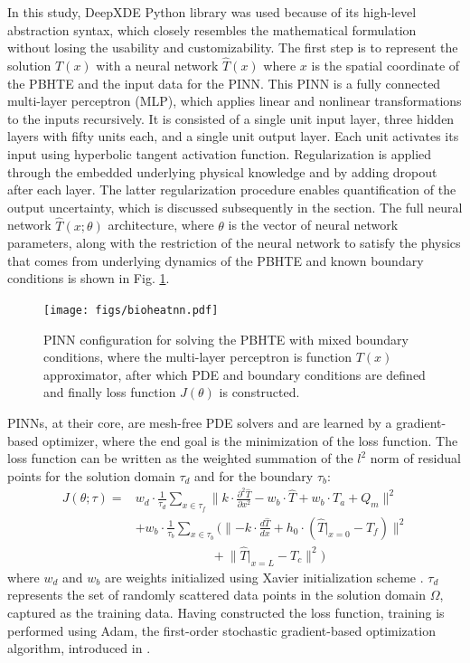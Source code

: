 \documentclass[conference]{IEEEtran}
\begin{document}
In this study, DeepXDE Python library \cite{lu_deepxde_2019} was used because of its high-level abstraction syntax, which closely resembles the mathematical formulation without losing the usability and customizability. The first step is to represent the solution $T(x)$ with a neural network $\hat{T}(x)$ where $x$ is the spatial coordinate of the PBHTE and the input data for the PINN. This PINN is a fully connected multi-layer perceptron (MLP), which applies linear and nonlinear transformations to the inputs recursively. It is consisted of a single unit input layer, three hidden layers with fifty units each, and a single unit output layer. Each unit activates its input using hyperbolic tangent activation function. Regularization is applied through the embedded underlying physical knowledge and by adding dropout after each layer. The latter regularization procedure enables quantification of the output uncertainty, which is discussed subsequently in the section. The full neural network $\hat T(x;\theta)$ architecture, where $\theta$ is the vector of neural network parameters, along with the restriction of the neural network to satisfy the physics that comes from underlying dynamics of the PBHTE and known boundary conditions is shown in Fig. \ref{fig.bioheatnn}.
\begin{figure}[ht]
  \centering
  \texttt{[image: figs/bioheatnn.pdf]}
  \caption{PINN configuration for solving the PBHTE with mixed boundary conditions, where the multi-layer perceptron is function $T(x)$ approximator, after which PDE and boundary conditions are defined and finally loss function $J(\theta)$ is constructed.}
  \label{fig.bioheatnn}
\end{figure}

PINNs, at their core, are mesh-free PDE solvers and are learned by a gradient-based optimizer, where the end goal is the minimization of the loss function. The loss function can be written as the weighted summation of the $l^2$ norm of residual points for the solution domain $\tau_d$ and for the boundary $\tau_b$:
\begin{equation}
\begin{aligned}
    J(\theta; \tau) = & w_d \cdot \frac{1}{\tau_d} \sum_{x \in \tau_f} \lVert k \cdot \frac{\partial^2 \hat{T}}{\partial x^2} - w_b \cdot \hat{T} + w_b \cdot T_a + Q_m \lVert^2 \\
    & + w_b \cdot \frac{1}{\tau_b} \sum_{x \in \tau_b} \Big( \lVert -k \cdot \frac{d \hat{T}}{dx} + h_0 \cdot (\hat{T}|_{x=0} - T_f) \lVert^2\\
    &\quad\quad\quad\quad\quad\quad+ \lVert \hat{T}|_{x=L} - T_c \lVert^2 \Big)
\end{aligned}
\label{eqn.loss}
\end{equation}
where $w_d$ and $w_b$ are weights initialized using Xavier initialization scheme \cite{glorot_bengio_2010}. 
$\tau_d$ represents the set of randomly scattered data points in the solution domain $\Omega$, captured as the training data.
Having constructed the loss function, training is performed using Adam, the first-order stochastic gradient-based optimization algorithm, introduced in \cite{kingma_adam_2014}. 
\end{document}
